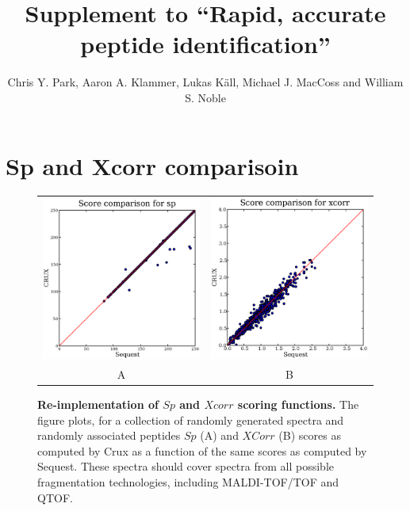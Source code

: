 \documentclass{article}
\begin{document}
\title{Supplement to ``Rapid, accurate peptide identification''}

\author{Chris Y. Park, Aaron A. Klammer, Lukas K\"{a}ll, Michael J. MacCoss
and William S. Noble}

\maketitle

\section{Sp and Xcorr comparisoin}
\begin{figure}
  \centering
  \begin{tabular}{cc}
    \includegraphics[width=2.5in]{../../results/paper-figure/second-score/fig-2-random-sp.eps} &
    \includegraphics[width=2.5in]{../../results/paper-figure/second-score/fig-2-random-xcorr.eps} \\
  A & B \\
  \end{tabular}
  \caption{{\bf Re-implementation of $Sp$ and $Xcorr$ scoring functions.}
  The figure plots, for a collection of randomly generated spectra and
  randomly associated peptides 
  $Sp$ (A) and $XCorr$ (B) scores as computed by Crux as a function of the
  same scores as computed by {\sc Sequest}. These spectra should cover
  spectra from all possible fragmentation technologies, including
  MALDI-TOF/TOF and QTOF.
  \label{figure:sp-xcorr-random}}
\end{figure}
\end{document}
